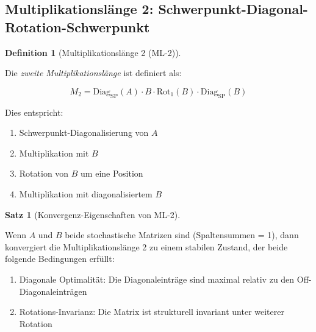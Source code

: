 \documentclass[a4paper,12pt]{article}
\theoremstyle{definition}
\newtheorem{definition}{Definition}
\newtheorem{satz}{Satz}
\begin{document}
\subsection{Multiplikationslänge 2: Schwerpunkt-Diagonal-Rotation-Schwerpunkt}

\begin{definition}[Multiplikationslänge 2 (ML-2)]
\label{def:ml2}

Die \emph{zweite Multiplikationslänge} ist definiert als:

\begin{equation}
M_2 = \text{Diag}_{\text{SP}}(A) \cdot B \cdot \text{Rot}_{1}(B) \cdot \text{Diag}_{\text{SP}}(B)
\end{equation}

Dies entspricht:
\begin{enumerate}
\item Schwerpunkt-Diagonalisierung von $A$
\item Multiplikation mit $B$
\item Rotation von $B$ um eine Position
\item Multiplikation mit diagonalisiertem $B$
\end{enumerate}

\end{definition}

\begin{satz}[Konvergenz-Eigenschaften von ML-2]
\label{satz:ml2_konvergenz}

Wenn $A$ und $B$ beide stochastische Matrizen sind (Spaltensummen = 1), dann konvergiert die Multiplikationslänge 2 zu einem stabilen Zustand, der beide folgende Bedingungen erfüllt:

\begin{enumerate}
\item Diagonale Optimalität: Die Diagonaleinträge sind maximal relativ zu den Off-Diagonaleinträgen
\item Rotations-Invarianz: Die Matrix ist strukturell invariant unter weiterer Rotation
\end{enumerate}

\end{satz}
\end{document}
